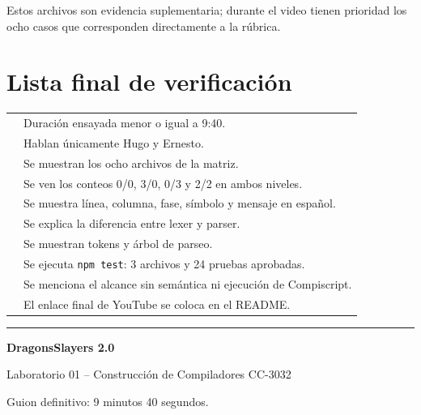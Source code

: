 \documentclass[11pt,letterpaper,oneside]{article}
\newcommand{\codigo}[1]{\texttt{#1}}
\newcommand{\checkbox}{\fbox{\rule{0pt}{1.1ex}\hspace{1.1ex}}}
\begin{document}
Estos archivos son evidencia suplementaria; durante el video tienen prioridad los
ocho casos que corresponden directamente a la rúbrica.

\section{Lista final de verificación}

\begin{tabularx}{\textwidth}{p{} X}
\checkbox & Duración ensayada menor o igual a 9:40. \\
\checkbox & Hablan únicamente Hugo y Ernesto. \\
\checkbox & Se muestran los ocho archivos de la matriz. \\
\checkbox & Se ven los conteos 0/0, 3/0, 0/3 y 2/2 en ambos niveles. \\
\checkbox & Se muestra línea, columna, fase, símbolo y mensaje en español. \\
\checkbox & Se explica la diferencia entre lexer y parser. \\
\checkbox & Se muestran tokens y árbol de parseo. \\
\checkbox & Se ejecuta \codigo{npm test}: 3 archivos y 24 pruebas aprobadas. \\
\checkbox & Se menciona el alcance sin semántica ni ejecución de Compiscript. \\
\checkbox & El enlace final de YouTube se coloca en el README. \\
\end{tabularx}

\vfill
\begin{center}
\color{uvgblue}\rule{0.75\textwidth}{0.8pt}\color{black}

\textbf{DragonsSlayers 2.0}\par
Laboratorio 01 -- Construcción de Compiladores CC-3032\par
Guion definitivo: 9 minutos 40 segundos.
\end{center}
\end{document}
